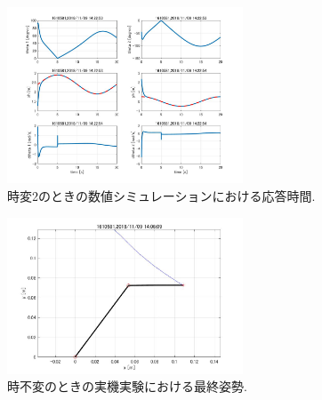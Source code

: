 \documentclass[twocolumn, 10pt,a4j]{jsarticle}
\begin{document}
\begin{enumerate}
        \begin{figure}[H]
          \begin{center}
            \includegraphics[width=7cm]{../img/kadai45/jpg_hand_zihen_auto_zikan_2.jpg}
            \caption{時変2のときの数値シミュレーションにおける応答時間.}
          \end{center}
        \end{figure}
        \begin{figure}[H]
          \begin{center}
            \includegraphics[width=7cm]{../img/kadai45/jpg_zissai_hand_zifuhen_saisyu_sise.jpg}
            \caption{時不変のときの実機実験における最終姿勢.}
          \end{center}
        \end{figure}
        

\end{enumerate}
\end{document}
